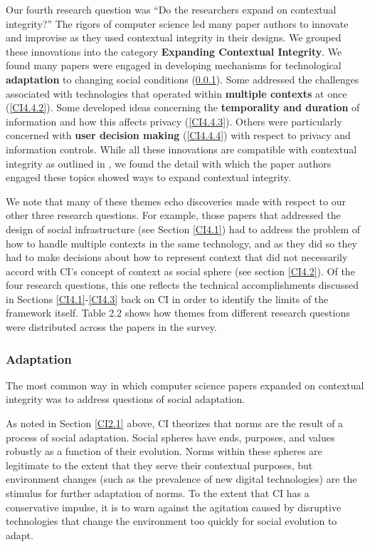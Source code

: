 \documentclass[../thesis.tex]{subfiles}
\begin{document}
Our fourth research question was ``Do the researchers
expand on contextual integrity?'' The rigors of
computer science led many paper authors to innovate and improvise as
they used contextual integrity in their designs. We grouped these
innovations into the category \textbf{Expanding Contextual Integrity}.
We found many papers were engaged in developing mechanisms for
technological \textbf{adaptation} to changing social conditions
(\ref{CI4.4.1}). Some addressed the challenges associated with technologies
that operated within \textbf{multiple contexts} at once (\ref{CI4.4.2}). Some
developed ideas concerning the \textbf{temporality and duration} of
information and how this affects privacy (\ref{CI4.4.3}). Others were
particularly concerned with \textbf{user decision making} (\ref{CI4.4.4}) with
respect to privacy and information controls. While all these
innovations are compatible with contextual integrity as outlined in
\citet{nissenbaum2009privacy}, we found the detail with which the paper authors
engaged these topics showed ways to expand contextual integrity.

We note that many of these themes echo discoveries made with respect to
our other three research questions. For example, those papers that
addressed the design of social infrastructure (see Section \ref{CI4.1}) had to
address the problem of how to handle multiple contexts in the same
technology, and as they did so they had to make decisions about how to
represent context that did not necessarily accord with
CI's concept of context as social sphere (see section
\ref{CI4.2}). Of the four research questions, this one reflects the technical
accomplishments discussed in Sections \ref{CI4.1}-\ref{CI4.3}
back on CI in order to
identify the limits of the framework itself. Table 2.2 shows how themes
from different research questions were distributed across the papers in
the survey.

\subsubsection{Adaptation}
\label{CI4.4.1}

The most common way in which computer science papers expanded on
contextual integrity was to address questions of social adaptation.

As noted in Section \ref{CI2.1} above, CI theorizes that norms are the result of
a process of social adaptation. Social spheres have ends, purposes, and
values robustly as a function of their evolution. Norms within these
spheres are legitimate to the extent that they serve their contextual
purposes, but environment changes (such as the prevalence of new
digital technologies) are the stimulus for further adaptation of norms.
To the extent that CI has a conservative impulse, it is to warn against
the agitation caused by disruptive technologies that change the
environment too quickly for social evolution to adapt.
\end{document}
